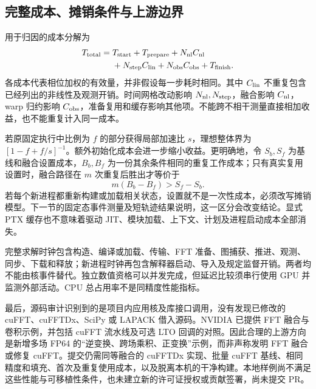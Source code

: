 \subsection{完整成本、摊销条件与上游边界}

用于归因的成本分解为
\begin{equation}
\label{eq:cost}
\begin{aligned}
T_{\rm total}={}&T_{\rm start}+T_{\rm prepare}+N_{\rm nl}C_{\rm nl}\\
&+N_{\rm step}C_{\rm lin}+N_{\rm obs}C_{\rm obs}+T_{\rm finish}.
\end{aligned}
\end{equation}
各成本代表相位加权的有效量，并非假设每一步耗时相同。其中 \(C_{\rm lin}\) 不重复包含已经列出的非线性及观测开销。时间网格改动影响 \(N_{\rm nl},N_{\rm step}\)，融合影响 \(C_{\rm nl}\)，warp 归约影响 \(C_{\rm obs}\)，准备复用和缓存影响其他项。不能跨不相干测量直接相加收益，也不能重复计入同一成本。

若原固定执行中比例为 \(f\) 的部分获得局部加速比 \(s\)，理想整体界为 \([1-f+f/s]^{-1}\)。额外初始化成本会进一步缩小收益。更明确地，令 \(S_b,S_f\) 为基线和融合设置成本，\(B_b,B_f\) 为一份其余条件相同的重复工作成本；只有真实复用设置时，融合路径在 \(m\) 次重复后胜出才等价于
\begin{equation}
\label{eq:op-amortization}
m(B_b-B_f)>S_f-S_b.
\end{equation}
若每个新进程都重新构建或加载相关状态，设置就不是一次性成本，必须改写摊销模型。下一节的固定态事件测量及短轨迹结果说明，这一区分会改变结论。显式 PTX 缓存也不意味着驱动 JIT、模块加载、上下文、计划及进程启动成本全部消失。

完整求解时钟包含构造、编译或加载、传输、FFT 准备、图捕获、推进、观测、同步、下载和释放；新进程时钟再包含解释器启动、导入及规定监督开销。两者均不能由核事件替代。独立数值资格可以并发完成，但延迟比较须串行使用 GPU 并监测外部活动。CPU 总占用率不是同精度性能指标。

最后，源码审计识别到的是项目内应用核及库接口调用，没有发现已修改的 cuFFT、cuFFTDx、SciPy 或 LAPACK 借入源码。NVIDIA 已提供 FFT 融合与卷积示例，并包括 cuFFT 流水线及可选 LTO 回调的对照\cite{r17}。因此合理的上游方向是新增多场 FP64 的“逆变换、跨场乘积、正变换”示例，而非声称发明 FFT 融合或修复 cuFFT。提交仍需同等融合的 cuFFTDx 实现、批量 cuFFT 基线、相同精度和填充、首次及重复使用成本，以及脱离本机的干净构建。本地样例尚不满足这些性能与可移植性条件，也未建立新的许可证授权或贡献签署，尚未提交 PR\cite{r19}。


